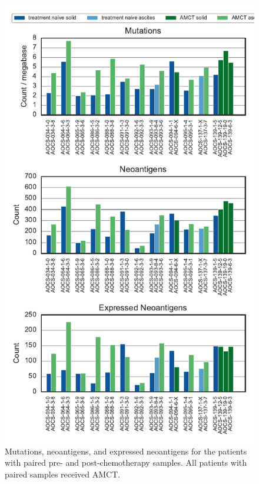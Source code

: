 \begin{figure}
\centering
\includegraphics[scale=1.0]{figures/paired_counts.pdf}
\caption{Mutations, neoantigens, and expressed neoantigens for the patients with paired pre- and post-chemotherapy samples. All patients with paired samples received AMCT.}
\label{fig:supp_paired}
\end{figure}

